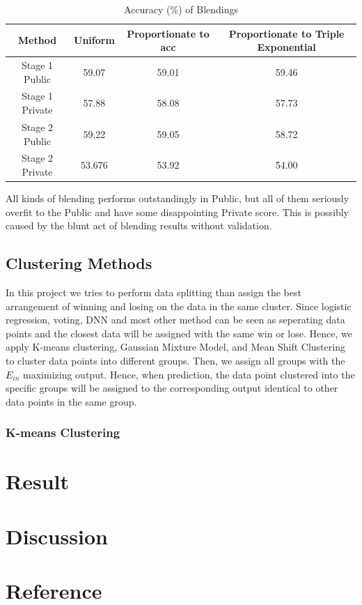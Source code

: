 \documentclass[12pt,a4paper]{article}
\begin{document}
\begin{table}[H]
  \centering
  \begin{tabular}{|c|c|c|c|}
  \hline
  Method & Uniform & Proportionate to acc & Proportionate to Triple Exponential \\ \hline
  Stage 1 Public & 59.07 & 59.01 & 59.46 \\ \hline
  Stage 1 Private & 57.88 & 58.08 & 57.73 \\ \hline
  Stage 2 Public & 59.22 & 59.05 & 58.72 \\ \hline
  Stage 2 Private & 53.676 & 53.92 & 54.00 \\ \hline
  \end{tabular}
  \caption{Accuracy (\%) of Blendings}
  \label{tab:blending-acc}
\end{table}

All kinds of blending performs outstandingly in Public, but all of them seriously overfit to the Public and have some disappointing Private score. 
This is possibly caused by the blunt act of blending results without validation.

\subsection{Clustering Methods}
In this project we tries to perform data splitting than assign the best arrangement of winning and losing on the data in the same cluster.
Since logistic regression, voting, DNN and most other method can be seen as seperating data points and the closest data will be assigned with the same win or lose.
Hence, we apply K-means clustering, Gaussian Mixture Model, and Mean Shift Clustering to cluster data points into different groups.
Then, we assign all groups with the $E_{in}$ maximizing output.
Hence, when prediction, the data point clustered into the specific groups will be assigned to the corresponding output identical to other data points in the same group.

\subsubsection{K-means Clustering}

\section{Result}

\section{Discussion}

\section{Reference}
\end{document}
